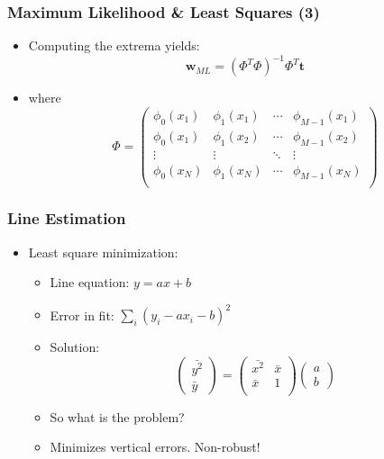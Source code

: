 \documentclass[10pt]{beamer}
\begin{document}
\begin{frame}
  \frametitle{Maximum Likelihood \& Least Squares (3)}
  \begin{itemize}
  \item Computing the extrema yields:
    \[
    {\mathbf w}_{ML} = \left( \Phi^T \Phi \right)^{-1} \Phi^T
    {\mathbf t}
    \]
  \item where
    \[
    \Phi = \left(
      \begin{array}{cccc}
        \phi_0(x_1) & \phi_1(x_1) & \cdots & \phi_{M-1}(x_1) \\
        \phi_0(x_1) & \phi_1(x_2) & \cdots & \phi_{M-1}(x_2) \\
        \vdots      & \vdots      & \ddots & \vdots         \\
        \phi_0(x_N) & \phi_1(x_N) & \cdots & \phi_{M-1}(x_N) \\
      \end{array}
    \right)
    \]
  \end{itemize}
\end{frame}

\begin{frame}
  \frametitle{Line Estimation}
  \begin{itemize}
  \item Least square minimization:
    \begin{itemize}\setlength{\itemsep}{0pt}
    \item Line equation: $y=a x + b$
    \item Error in fit: $\sum_i (y_i - a x_i - b)^2$
    \item Solution: \[
      \left( \begin{array}{c} \bar{y^2}\\ \bar{y} \end{array}
      \right) = \left( \begin{array}{cc}
          \bar{x^2} & \bar{x} \\
          \bar{x}   & 1\\ \end{array} \right) \left(
        \begin{array}{c} a \\ b \end{array} \right)
      \]
    \item So what is the problem? \pause
    \item Minimizes vertical errors. Non-robust!
    \end{itemize}
  \end{itemize}
\end{frame}
\end{document}
